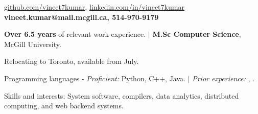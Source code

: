 \documentclass{resume} %
\begin{document}
\begin{hSubsection}
{
    \href{https://github.com/vineet7kumar}{github.com/vineet7kumar},
    \href{https://linkedin.com/in/vineet7kumar}{linkedin.com/in/vineet7kumar}
}
{
    \textbf{vineet.kumar@mail.mcgill.ca, 514-970-9179}
}
{%
}
\end{hSubsection}



\smallskip \smallskip 
\begin{rSection}{} \smallskip 
\begin{lSubsection} 
\item \textbf{Over 6.5 years} of relevant work experience.
        $\vert$ \textbf{M.Sc Computer Science}, McGill University. 
\item Relocating to Toronto, available from July.
\item Programming languages - \emph{Proficient:} Python, C++, Java.
        $\vert$ \emph{Prior experience:} \xtenx, \matlabx.
\item Skills and interests: System software, compilers, data analytics,
        distributed computing, and web backend systems.
\end{lSubsection}
\end{rSection}
\end{document}
